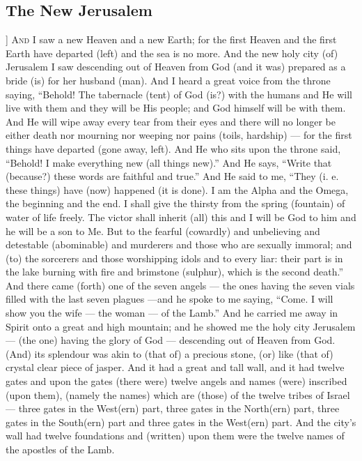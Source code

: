 \begin{pages}
\begin{Leftside}
        			\chapter{The New Jerusalem}
				]		
		\renewcommand{\LettrineFontHook}{\Zallmanfamily}
		\lettrine[lines=3]{A}{nd} I saw a new Heaven and a new Earth; for the first Heaven and the first Earth have departed (left) and the sea is no more. And the new holy city (of) Jerusalem I saw descending out of Heaven from God (and it was) prepared as a bride (is) for her husband (man). And I heard a great voice from the throne saying, “Behold! The tabernacle (tent) of God (is?) with the humans and He will live with them and they will be His people; and God himself will be with them. And He will wipe away every tear from their eyes and there will no longer be either death nor mourning nor weeping nor pains (toils, hardship) — for the first things have departed (gone away, left). 
		\pend
		\pstart
		And He who sits upon the throne said, “Behold! I make everything new (all things new).” And He says, “Write that (because?) these words are faithful and true.” And He said to me, “They (i. e. these things) have (now) happened (it is done). I am the Alpha and the Omega, the beginning and the end. I shall give the thirsty from the spring (fountain) of water of life freely. The victor shall inherit (all) this and I will be God to him and he will be a son to Me. But to the fearful (cowardly) and unbelieving and detestable (abominable) and murderers and those who are sexually immoral; and (to) the sorcerers and those worshipping idols and to every liar: their part is in the lake burning with fire and brimstone (sulphur), which is the second death.”
		\pend
		\pstart
		And there came (forth) one of the seven angels — the ones having the seven vials filled with the last seven plagues —and he spoke to me saying, “Come. I will show you the wife — the woman — of the Lamb.” And he carried me away in Spirit onto a great and high mountain; and he showed me the holy city Jerusalem — (the one) having the glory of God — descending out of Heaven from God. (And) its splendour was akin to (that of) a precious stone, (or) like (that of) crystal clear piece of jasper. 
		\pend
		\pstart
		And it had a great and tall wall, and it had twelve gates and upon the gates (there were) twelve angels and names (were) inscribed (upon them), (namely the names) which are (those) of the twelve tribes of Israel — three gates in the West(ern) part, three gates in the North(ern) part, three gates in the South(ern) part and three gates in the West(ern) part. And the city’s wall had twelve foundations and (written) upon them were the twelve names of the apostles of the Lamb. 

\end{Leftside}
\end{pages}
